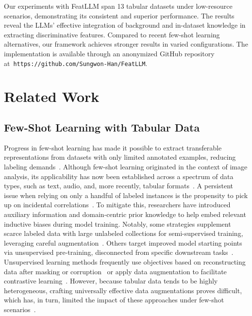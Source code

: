 Our experiments with \textsf{FeatLLM} span 13 tabular datasets under low-resource scenarios, demonstrating its consistent and superior performance. The results reveal the LLMs' effective integration of background and in-dataset knowledge in extracting discriminative features. Compared to recent few-shot learning alternatives, our framework achieves stronger results in varied configurations. The implementation is available through an anonymized GitHub repository at~\texttt{https://github.com/Sungwon-Han/FeatLLM}.

\section{Related Work}

\subsection{Few-Shot Learning with Tabular Data}

Progress in few-shot learning has made it possible to extract transferable representations from datasets with only limited annotated examples, reducing labeling demands~\cite{chen2018closer}. Although few-shot learning originated in the context of image analysis, its applicability has now been established across a spectrum of data types, such as text, audio, and, more recently, tabular formats~\cite{majumder2022few,nam2023stunt,schick2021exploiting}. A persistent issue when relying on only a handful of labeled instances is the propensity to pick up on incidental correlations~\cite{bartlett2021deep}. To mitigate this, researchers have introduced auxiliary information and domain-centric prior knowledge to help embed relevant inductive biases during model training. Notably, some strategies supplement scarce labeled data with large unlabeled collections for semi-supervised training, leveraging careful augmentation~\cite{ucar2021subtab,yoon2020vime}. Others target improved model starting points via unsupervised pre-training, disconnected from specific downstream tasks~\cite{somepalli2021saint}. Unsupervised learning methods frequently use objectives based on reconstructing data after masking or corruption~\cite{arik2021tabnet,majmundar2022met} or apply data augmentation to facilitate contrastive learning~\cite{bahri2022scarf,chen2020simple}. However, because tabular data tends to be highly heterogeneous, crafting universally effective data augmentations proves difficult, which has, in turn, limited the impact of these approaches under few-shot scenarios~\cite{nam2023stunt}.


